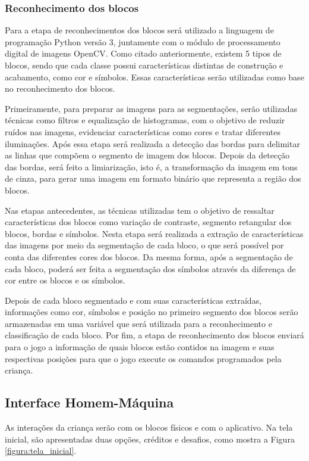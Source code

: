    \subsubsection{Reconhecimento dos blocos}
     
     Para a etapa de reconhecimentos dos blocos será utilizado a linguagem de programação Python versão 3, juntamente com o módulo de processamento digital de imagens OpenCV.
 Como citado anteriormente, existem 5 tipos de blocos, sendo que cada classe possui características distintas de construção e acabamento, como cor e símbolos. Essas características serão utilizadas como base no reconhecimento dos blocos.
    
    Primeiramente, para preparar as imagens para as segmentações, serão utilizadas técnicas como filtros e equalização de histogramas, com o objetivo de reduzir ruídos nas imagens, evidenciar características como cores e tratar diferentes iluminações. 
    Após essa etapa será realizada a detecção das bordas para delimitar as linhas que compõem o segmento de imagem dos blocos. Depois da detecção das bordas, será feito a limiarização, isto é, a transformação da imagem em tons de cinza, para gerar uma imagem em formato binário que representa a região dos blocos.  
    
    Nas etapas antecedentes, as técnicas utilizadas tem o objetivo de ressaltar características dos blocos como variação de contraste, segmento retangular dos blocos, bordas e símbolos. Nesta etapa  será realizada a extração de características das imagens por meio da segmentação de cada bloco, o que será possível por conta das diferentes cores dos blocos. Da mesma forma, após a segmentação de cada bloco, poderá ser feita a segmentação dos símbolos através da diferença de cor entre os blocos e os símbolos.
    
	Depois de cada bloco segmentado e com suas características extraídas, informações como cor, símbolos e posição no primeiro segmento dos blocos serão armazenadas em uma variável que será utilizada para a reconhecimento e classificação de cada bloco.
	Por fim, a etapa de reconhecimento dos blocos enviará para o jogo a informação de quais blocos estão contidos na imagem e suas respectivas posições para que o jogo execute os comandos programados pela criança.

    
    
    \subsection{Interface Homem-Máquina}
    As interações da criança serão com os blocos físicos e com o aplicativo.
    Na tela inicial, são apresentadas duas opções, créditos e desafios, como mostra a Figura \ref{figura:tela_inicial}.
    
